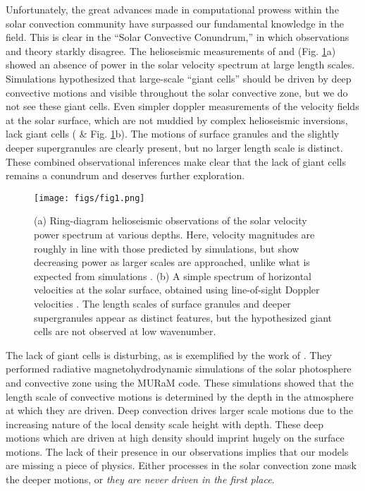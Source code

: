 \documentclass[aasms,12pt]{article}
\begin{document}
Unfortunately, the great advances made in computational prowess within the solar convection
community have surpassed our fundamental knowledge in the field. This is clear in the
``Solar Convective Conundrum,'' in which observations and theory starkly disagree.
The helioseismic measurements of \cite{hanasoge&all2012} and \cite{greer&all2015} (Fig. \ref{fig:fig1}a)
showed an absence of power in the solar velocity spectrum at large length scales.  Simulations
hypothesized that large-scale
``giant cells'' should be driven by deep convective motions and visible throughout the solar convective
zone, but we do not see these giant cells.
Even simpler doppler measurements of the velocity fields at the solar surface, which are not muddied
by complex helioseismic inversions, lack
giant cells (\citealt{hathaway&all2015} \& Fig. \ref{fig:fig1}b).  
The motions of surface granules and the slightly deeper supergranules are clearly present, but no
larger length scale is distinct.  These combined observational inferences make clear that the lack of
giant cells remains a conundrum and deserves further exploration.

\begin{figure}[t]
\centering
\texttt{[image: figs/fig1.png]}
\caption{(a) Ring-diagram helioseismic observations of the solar velocity power spectrum at various depths.  
Here, velocity magnitudes are roughly in line with those
predicted by simulations, but show decreasing power as larger scales are approached, unlike
what is expected from simulations \cite{greer&all2015}.  (b) A simple spectrum of horizontal
velocities at the solar surface, obtained using line-of-sight Doppler velocities \cite{hathaway&all2015}.
The length scales of surface granules and deeper supergranules appear as distinct features, but
the hypothesized giant cells are not observed at low wavenumber.
        \label{fig:fig1}}
\end{figure}

The lack of giant cells is disturbing, as is exemplified by the work of \cite{lord&all2014}.  They
performed radiative magnetohydrodynamic simulations of the solar photosphere and convective zone using the
MURaM code.  These simulations
showed that the length scale of convective motions is determined by the depth in the atmosphere at 
which they are driven. Deep convection drives larger scale motions due to the increasing nature of the
local density scale height with depth. These deep motions which are driven at high density should imprint
hugely on the surface motions.
The lack of their presence in our observations implies that our models are missing a piece of physics. 
Either processes in the solar convection zone mask the deeper motions, or \emph{they are never driven
in the first place}.
\end{document}
